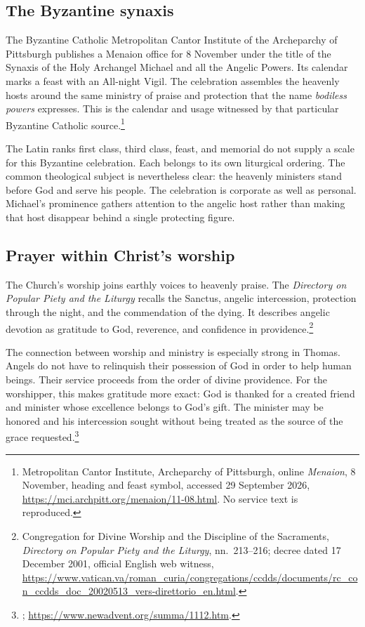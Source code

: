 \subsection{The Byzantine synaxis}

The Byzantine Catholic Metropolitan Cantor Institute of the Archeparchy of
Pittsburgh publishes a Menaion office for 8 November under the title of the
Synaxis of the Holy Archangel Michael and all the Angelic Powers. Its
calendar marks a feast with an All-night Vigil. The celebration assembles
the heavenly hosts around the same ministry of praise and protection that
the name \emph{bodiless powers} expresses. This is the calendar and usage
witnessed by that particular Byzantine Catholic source.\footnote{Metropolitan
Cantor Institute, Archeparchy of Pittsburgh, online \emph{Menaion},
8 November, heading and feast symbol, accessed 29 September 2026,
\url{https://mci.archpitt.org/menaion/11-08.html}. No service text is reproduced.}

The Latin ranks first class, third class, feast, and memorial do not supply
a scale for this Byzantine celebration. Each belongs to its own liturgical
ordering. The common theological subject is nevertheless clear: the
heavenly ministers stand before God and serve his people. The celebration
is corporate as well as personal. Michael's prominence gathers attention
to the angelic host rather than making that host disappear behind a single
protecting figure.

\subsection{Prayer within Christ's worship}

The Church's worship joins earthly voices to heavenly praise. The
\emph{Directory on Popular Piety and the Liturgy} recalls the Sanctus,
angelic intercession, protection through the night, and the commendation
of the dying. It describes angelic devotion as gratitude to God, reverence,
and confidence in providence.\footnote{Congregation for Divine Worship and
the Discipline of the Sacraments, \emph{Directory on Popular Piety and the
Liturgy}, nn.~213--216; decree dated 17 December 2001, official English
web witness,
\url{https://www.vatican.va/roman_curia/congregations/ccdds/documents/rc_con_ccdds_doc_20020513_vers-direttorio_en.html}.}

The connection between worship and ministry is especially strong in Thomas.
Angels do not have to relinquish their possession of God in order to help
human beings. Their service proceeds from the order of divine providence.
For the worshipper, this makes gratitude more exact: God is thanked for a
created friend and minister whose excellence belongs to God's gift. The
minister may be honored and his intercession sought without being treated
as the source of the grace requested.\footnote{; \url{https://www.newadvent.org/summa/1112.htm}.}

